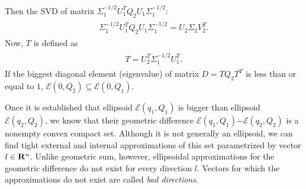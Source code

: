 \documentclass[letterpaper,10pt,english]{sphinxmanual}
\begin{document}
Then the SVD of matrix
\(\Sigma_1^{-1/2}U_1^TQ_2U_1\Sigma_1^{-1/2}\):
\label{chap_ellcalc:equation-simdiag2}\begin{gather}
\begin{split}\Sigma_1^{-1/2}U_1^TQ_2U_1\Sigma_1^{-1/2} = U_2\Sigma_2V_2^T.\end{split}\label{chap_ellcalc-simdiag2}
\end{gather}
Now, \(T\) is defined as
\label{chap_ellcalc:equation-simdiag3}\begin{gather}
\begin{split}T = U_2^T \Sigma_1^{-1/2}U_1^T.\end{split}\label{chap_ellcalc-simdiag3}
\end{gather}
If the biggest diagonal element (eigenvalue) of matrix \(D=TQ_2T^T\)
is less than or equal to \(1\),
\({\mathcal E}(0,Q_2)\subseteq{\mathcal E}(0,Q_1)\).

Once it is established that ellipsoid \({\mathcal E}(q_1,Q_1)\) is
bigger than ellipsoid \({\mathcal E}(q_2,Q_2)\), we know that their
geometric difference
\({\mathcal E}(q_1,Q_1)\dot{-}{\mathcal E}(q_2,Q_2)\) is a nonempty
convex compact set. Although it is not generally an ellipsoid, we can
find tight external and internal approximations of this set parametrized
by vector \(l\in{\bf R}^n\). Unlike geometric sum, however,
ellipsoidal approximations for the geometric difference do not exist for
every direction \(l\). Vectors for which the approximations do not
exist are called \emph{bad directions}.
\end{document}
